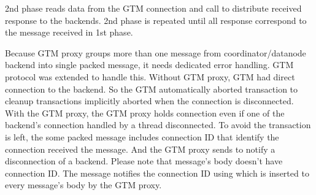   2nd phase reads data from the GTM connection and call  to distribute
  received response to the backends.
  2nd phase is repeated until all response correspond to the message received in 1st phase.
  
  Because GTM proxy groups more than one message from coordinator/datanode backend into single
  packed message, it needs dedicated error handling.
  GTM protocol was extended to handle this.
  Without GTM proxy, GTM had direct connection to the backend.
  So the GTM automatically aborted transaction to cleanup transactions implicitly aborted when
  the connection is disconnected.
  With the GTM proxy, the GTM proxy holds connection even if one of the backend's connection
  handled by a thread disconnected.
  To avoid the transaction is left, the some packed message includes connection ID that identify
  the connection received the message.
  And the GTM proxy sends  to notify a disconnection of a backend.
  Please note that  message's body doesn't have connection ID.
  The message notifies the connection ID using  which is inserted to every message's
  body by the GTM proxy.

